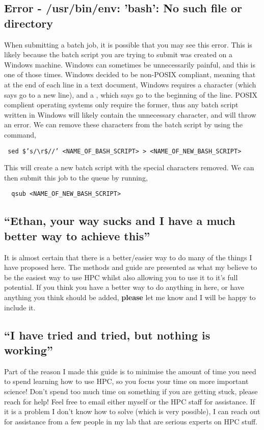 \subsection{Error - /usr/bin/env: 'bash': No such file or directory}
%
When submitting a batch job, it is possible that you may see this error. This is likely because the batch script you are trying to submit was created on a Windows machine. Windows can sometimes be unnecessarily painful, and this is one of those times. Windows decided to be non-POSIX compliant, meaning that at the end of each line in a text document, Windows requires a  character (which says go to a new line), and a , which says go to the beginning of the line. POSIX complient operating systems only require the former, thus any batch script written in Windows will likely contain the unnecessary  character, and will throw an error. We can remove these characters from the batch script by using the command,
%
%
\begin{verbatim}
 sed $’s/\r$//’ <NAME_OF_BASH_SCRIPT> > <NAME_OF_NEW_BASH_SCRIPT>
\end{verbatim}
%
%
%
This will create a new batch script with the special characters removed. We can then submit this job to the queue by running,

\begin{verbatim}
  qsub <NAME_OF_NEW_BASH_SCRIPT>
\end{verbatim}
%
%
%
%
\subsection{``Ethan, your way sucks and I have a much better way to achieve this''}
%
%
It is almost certain that there is a better/easier way to do many of the things I have proposed here. The methods and guide are presented as what my believe to be the easiest way to use HPC whilst also allowing you to use it to it's full potential. If you think you have a better way to do anything in here, or have anything you think should be added, \textbf{please} let me know and I will be happy to include it.
%
%
\subsection{``I have tried and tried, but nothing is working''}
%
%
Part of the reason I made this guide is to minimise the amount of time you need to spend learning how to use HPC, so you focus your time on more important science! Don't spend too much time on something if you are getting stuck, please reach for help! Feel free to email either myself or the HPC staff for assistance. If it is a problem I don't know how to solve (which is very possible), I can reach out for assistance from a few people in my lab that are serious experts on HPC stuff.
%
%
%
%
